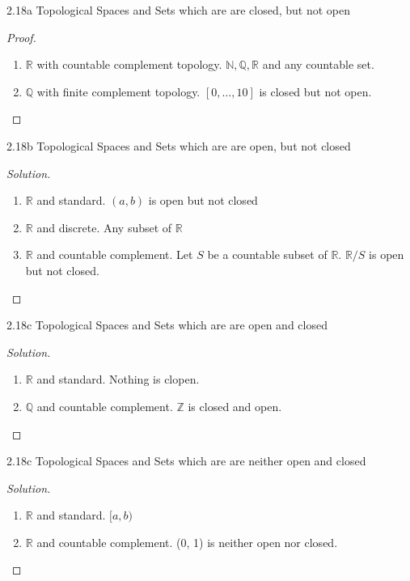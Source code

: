 \documentclass{article}
\newcommand{\R}{\mathbb{R}}
\newcommand{\Q}{\mathbb{Q}}
\newcommand{\Z}{\mathbb{Z}}
\newcommand{\N}{\mathbb{N}}
\newenvironment{solution}
{\renewcommand\qedsymbol{$\blacksquare$}\begin{proof}[Solution]}
{\end{proof}}
\begin{document}
\begin{PROB}{2.18a}\label{Problem 2.18a.}
    Topological Spaces and Sets which are are closed, but not open
\end{PROB}
\begin{proof}
    \begin{enumerate}
        \item $\R$ with countable complement topology. $\N, \Q, \R$ and any countable set. 
        \item $\Q$ with finite complement topology. $[0, \dots, 10]$ is closed but not open.       
    \end{enumerate}
\end{proof}
\begin{PROB}{2.18b}\label{Problem 2.18b.}
    Topological Spaces and Sets which are are open, but not closed
\end{PROB}
\begin{solution}
    \begin{enumerate}
        \item $\R$ and standard. $(a, b)$ is open but not closed
        \item $\R$ and discrete. Any subset of $\R$
        \item $\R$ and countable complement. Let $S$ be a countable subset of $\R$. $\R / S$ is open but not closed.        
    \end{enumerate}
\end{solution}
\begin{PROB}{2.18c}\label{Problem 2.18c.}
    Topological Spaces and Sets which are are open and closed
\end{PROB}
\begin{solution}
    \begin{enumerate}
        \item $\R$ and standard. Nothing is clopen. 
        \item $\Q$ and countable complement. $\Z$ is closed and open.         
    \end{enumerate}
\end{solution}
\begin{PROB}{2.18c}\label{Problem 2.18c.}
    Topological Spaces and Sets which are are neither open and closed
\end{PROB}
\begin{solution}
    \begin{enumerate}
        \item $\R$ and standard. $[a, b)$  
        \item $\R$ and countable complement. (0, 1) is neither open nor closed.        
    \end{enumerate}
\end{solution}
\end{document}
